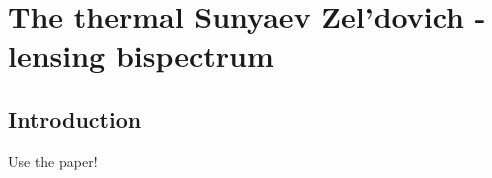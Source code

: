 \chapter{The thermal Sunyaev Zel'dovich - lensing bispectrum}
\label{chapter:9}

\section{Introduction} 

Use the paper!
